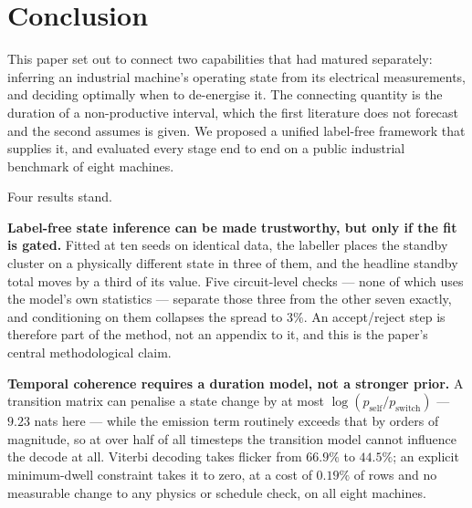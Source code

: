 %
%

\section{Conclusion}
\label{sec:conclusion}

This paper set out to connect two capabilities that had matured
separately: inferring an industrial machine's operating state from its
electrical measurements, and deciding optimally when to de-energise it.
The connecting quantity is the duration of a non-productive interval,
which the first literature does not forecast and the second assumes is
given. We proposed a unified label-free framework that supplies it, and
evaluated every stage end to end on a public industrial benchmark of
eight machines.

Four results stand.

\textbf{Label-free state inference can be made trustworthy, but only if
the fit is gated.} Fitted at ten seeds on identical data, the labeller
places the standby cluster on a physically different state in three of
them, and the headline standby total moves by a third of its value.
Five circuit-level checks --- none of which uses the model's own
statistics --- separate those three from the other seven exactly, and
conditioning on them collapses the spread to $3\%$. An accept/reject
step is therefore part of the method, not an appendix to it, and this is
the paper's central methodological claim.

\textbf{Temporal coherence requires a duration model, not a stronger
prior.} A transition matrix can penalise a state change by at most
$\log(p_{\text{self}}/p_{\text{switch}})$ --- $9.23$ nats here --- while
the emission term routinely exceeds that by orders of magnitude, so at
over half of all timesteps the transition model cannot influence the
decode at all. Viterbi decoding takes flicker from $66.9\%$ to $44.5\%$;
an explicit minimum-dwell constraint takes it to zero, at a cost of
$0.19\%$ of rows and no measurable change to any physics or schedule
check, on all eight machines.

